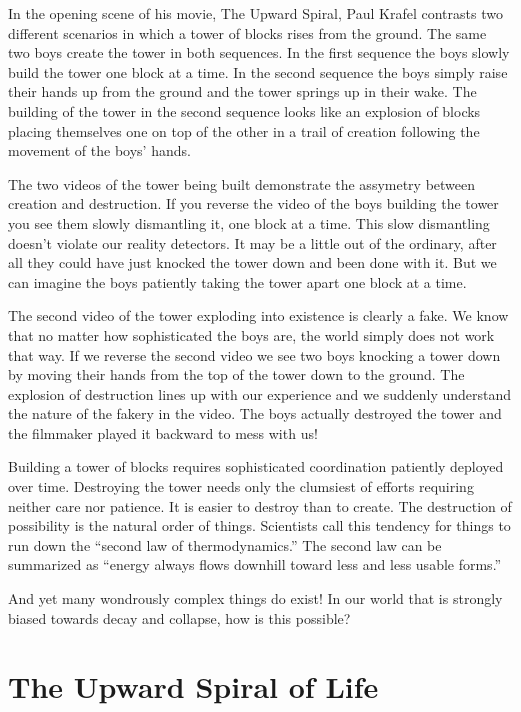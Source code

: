 \documentclass[ebook,11pt,openany,twoside,showtrims]{memoir}
\newcommand{\imagefacingchapter}[1]{
  \cleartoverso
  \clearpage \null
  \thispagestyle{cleared}
  \AddToShipoutPictureBG*{%
    \AtStockLowerLeft{%
      \texttt{[image: \#1]}
    }
  }
  \clearpage
}
\begin{document}
In the opening scene of his movie, The Upward Spiral, Paul Krafel contrasts two
different scenarios in which a tower of blocks rises from the ground. The same
two boys create the tower in both sequences. In the first sequence the boys
slowly build the tower one block at a time. In the second sequence the boys
simply raise their hands up from the ground and the tower springs up in their
wake. The building of the tower in the second sequence looks like an explosion
of blocks placing themselves one on top of the other in a trail of creation
following the movement of the boys' hands.

The two videos of the tower being built demonstrate the assymetry between
creation and destruction. If you reverse the video of the boys building the
tower you see them slowly dismantling it, one block at a time. This slow
dismantling doesn't violate our reality detectors. It may be a little out of
the ordinary, after all they could have just knocked the tower down and been
done with it. But we can imagine the boys patiently taking the tower apart one
block at a time.

The second video of the tower exploding into existence is clearly a fake. We
know that no matter how sophisticated the boys are, the world simply does not
work that way. If we reverse the second video we see two boys knocking a tower
down by moving their hands from the top of the tower down to the ground. The
explosion of destruction lines up with our experience and we suddenly
understand the nature of the fakery in the video. The boys actually destroyed
the tower and the filmmaker played it backward to mess with us!

Building a tower of blocks requires sophisticated coordination patiently
deployed over time. Destroying the tower needs only the clumsiest of efforts
requiring neither care nor patience. It is easier to destroy than to create.
The destruction of possibility is the natural order of things. Scientists call
this tendency for things to run down the ``second law of thermodynamics.'' The
second law can be summarized as ``energy always flows downhill toward less and
less usable forms.''

And yet many wondrously complex things do exist! In our world that is strongly
biased towards decay and collapse, how is this possible?

\imagefacingchapter{images/UpwardSpiral}
\chapter{The Upward Spiral of Life}
\end{document}

